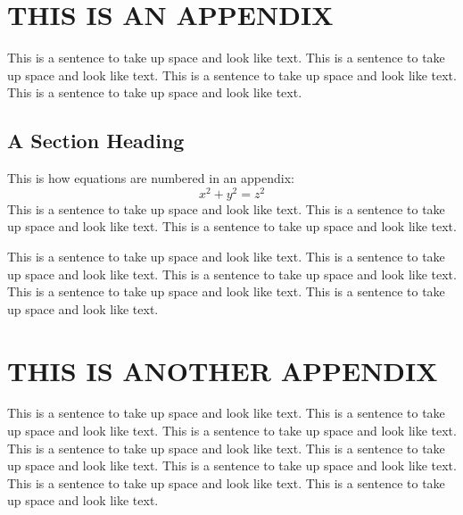  
\appendix    %

\chapter{THIS IS AN APPENDIX}
This is a sentence to take up space and look like text.
This is a sentence to take up space and look like text.
This is a sentence to take up space and look like text.
This is a sentence to take up space and look like text.

\section{A Section Heading}

This is how equations are numbered in an appendix:
\begin{equation}
x^2 + y^2 = z^2
\end{equation} 
This is a sentence to take up space and look like text.
This is a sentence to take up space and look like text.
This is a sentence to take up space and look like text.
 
This is a sentence to take up space and look like text.
This is a sentence to take up space and look like text.
This is a sentence to take up space and look like text.
This is a sentence to take up space and look like text.
This is a sentence to take up space and look like text. 

\chapter{THIS IS ANOTHER APPENDIX} 
This is a sentence to take up space and look like text.
This is a sentence to take up space and look like text.
This is a sentence to take up space and look like text.
This is a sentence to take up space and look like text.
This is a sentence to take up space and look like text.
This is a sentence to take up space and look like text.
This is a sentence to take up space and look like text.
This is a sentence to take up space and look like text.
 
